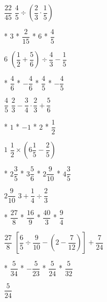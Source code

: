 $\dfrac{22}{45}$
$\dfrac{4}{5}\div\left(\dfrac{2}{3}\cdot\dfrac{1}{5}\right)$
\begin{task}
	* $3$
	* $\dfrac{2}{15}$
	* $6$
	* $\dfrac{4}{5}$
\end{task}
$6$
$\left(\dfrac{1}{2}+\dfrac{5}{6}\right)\div\dfrac{4}{3}-\dfrac{1}{5}$
\begin{task}
	* $\dfrac{4}{6}$
	* $-\dfrac{4}{6}$
	* $\dfrac{4}{5}$
	* $-\dfrac{4}{5}$
\end{task}
$\dfrac{4}{5}$
$\dfrac{2}{3}-\dfrac{3}{4}\cdot\dfrac{2}{3}+\dfrac{5}{6}$
\begin{task}
	* $1$
	* $-1$
	* $2$
	* $\dfrac{1}{2}$
\end{task}
$1$
$\dfrac{1}{2}\times\left(6\dfrac{1}{5}-\dfrac{2}{5}\right)$
\begin{task}
	* $2\dfrac{3}{5}$
	* $3\dfrac{5}{6}$
	* $2\dfrac{9}{10}$
	* $4\dfrac{3}{5}$
\end{task}
$2\dfrac{9}{10}$
$3+\dfrac{1}{4}\div\dfrac{2}{3}$
\begin{task}
	* $\dfrac{27}{8}$
	* $\dfrac{16}{9}$
	* $\dfrac{40}{3}$
	* $\dfrac{9}{4}$
\end{task}
$\dfrac{27}{8}$
$\left[\dfrac{6}{5}\div\dfrac{9}{10}-\left(2-\dfrac{7}{12}\right)\right]+\dfrac{7}{24}$
\begin{task}
	* $\dfrac{5}{34}$
	* $-\dfrac{5}{23}$
	* $\dfrac{5}{24}$
	* $\dfrac{5}{32}$
\end{task}
$\dfrac{5}{24}$
